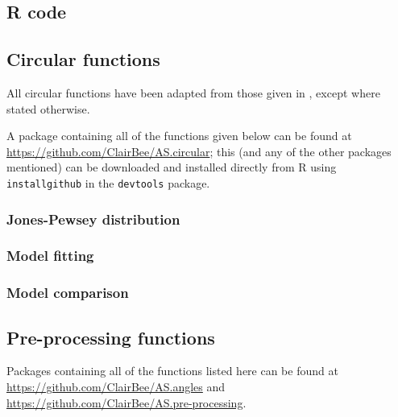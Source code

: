 \documentclass[10pt,fleqn]{article}
\numberwithin{equation}{section}
\begin{document}

\newpage

%


\newpage


\newpage

\begin{appendix}
\section{R code}

\subsection{Circular functions}

All circular functions have been adapted from those given in \cite{Pewsey2014}, except where stated otherwise. 

A package containing all of the functions given below can be found at \url{https://github.com/ClairBee/AS.circular}; this (and any of the other packages mentioned) can be downloaded and installed directly from R using \texttt{install\textunderscore github} in the \texttt{devtools} package.

\subsubsection{Jones-Pewsey distribution}


\subsubsection{Model fitting}


\subsubsection{Model comparison}


\subsection{Pre-processing functions}
Packages containing all of the functions listed here can be found at \url{https://github.com/ClairBee/AS.angles} and \url{https://github.com/ClairBee/AS.pre-processing}.



\end{appendix}
\end{document}
